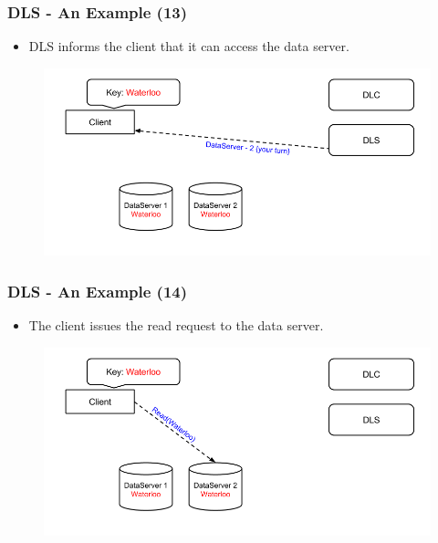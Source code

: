\documentclass{beamer}
\begin{document}
\begin{frame}
  \frametitle{DLS - An Example (13)}
  \begin{itemize}
  \item DLS informs the client that it can access the data server.
\newline
  \end{itemize}
  \begin{figure}
    \begin{center}
      \centerline{\includegraphics[scale=0.40]{img/DLS_Example07.png}}
    \end{center}
  \end{figure}
\end{frame}

\begin{frame}
  \frametitle{DLS - An Example (14)}
  \begin{itemize}
  \item The client issues the read request to the data server.
\newline
  \end{itemize}
  \begin{figure}
    \begin{center}
      \centerline{\includegraphics[scale=0.40]{img/DLS_Example08.png}}
    \end{center}
  \end{figure}
\end{frame}
\end{document}
